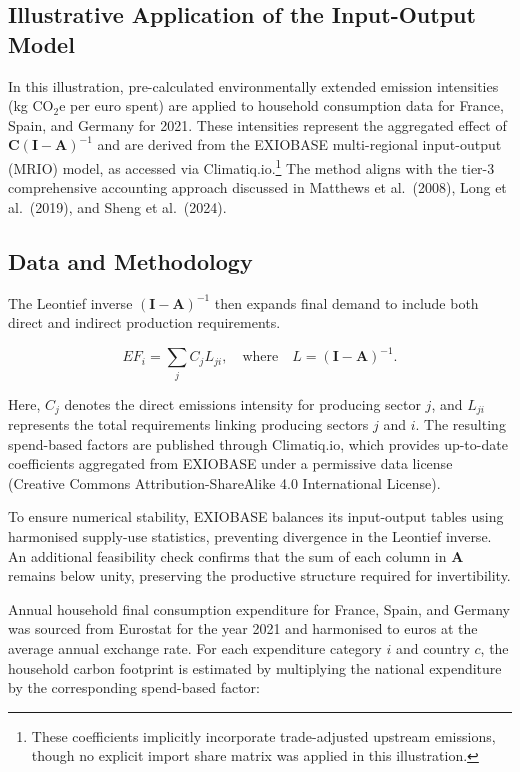 \documentclass[12pt,a4paper]{article}%
\begin{document}
\subsection{Illustrative Application of the Input-Output Model}

In this illustration, pre-calculated environmentally extended emission intensities (kg CO$_{2}$e per euro spent) are applied to household consumption data for France, Spain, and Germany for 2021. These intensities represent the aggregated effect of $\mathbf{C} {(\mathbf{I}-\mathbf{A})}^{-1}$ and are derived from the EXIOBASE multi-regional input-output (MRIO) model, as accessed via Climatiq.io.\footnote{These coefficients implicitly incorporate trade-adjusted upstream emissions, though no explicit import share matrix was applied in this illustration.} The method aligns with the tier-3 comprehensive accounting approach discussed in Matthews et al.~(2008), Long et al.~(2019), and Sheng et al.~(2024).

\subsection{Data and Methodology}

The Leontief inverse ${(\mathbf{I} - \mathbf{A})}^{-1}$ then expands final demand to include both direct and indirect production requirements.

\[
EF_i = \sum_{j} C_j L_{ji}, 
\quad \text{where} \quad 
L = {(\mathbf{I} - \mathbf{A})}^{-1}.
\]

Here, $C_j$ denotes the direct emissions intensity for producing sector $j$, and $L_{ji}$ represents the total requirements linking producing sectors $j$ and $i$. The resulting spend-based factors are published through Climatiq.io, which provides up-to-date coefficients aggregated from EXIOBASE under a permissive data license (Creative Commons Attribution-ShareAlike 4.0 International License).

To ensure numerical stability, EXIOBASE balances its input-output tables using harmonised supply-use statistics, preventing divergence in the Leontief inverse. An additional feasibility check confirms that the sum of each column in $\mathbf{A}$ remains below unity, preserving the productive structure required for invertibility.

Annual household final consumption expenditure for France, Spain, and Germany was sourced from Eurostat for the year 2021 and harmonised to euros at the average annual exchange rate. For each expenditure category $i$ and country $c$, the household carbon footprint is estimated by multiplying the national expenditure by the corresponding spend-based factor:
\end{document}
